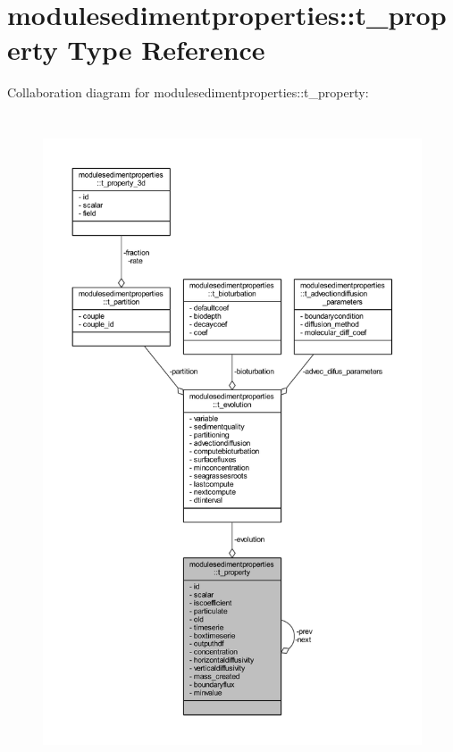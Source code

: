\hypertarget{structmodulesedimentproperties_1_1t__property}{}\section{modulesedimentproperties\+:\+:t\+\_\+property Type Reference}
\label{structmodulesedimentproperties_1_1t__property}


Collaboration diagram for modulesedimentproperties\+:\+:t\+\_\+property\+:\nopagebreak
\begin{figure}[H]
\begin{center}
\leavevmode
\includegraphics[height=550pt]{structmodulesedimentproperties_1_1t__property__coll__graph}
\end{center}
\end{figure}
